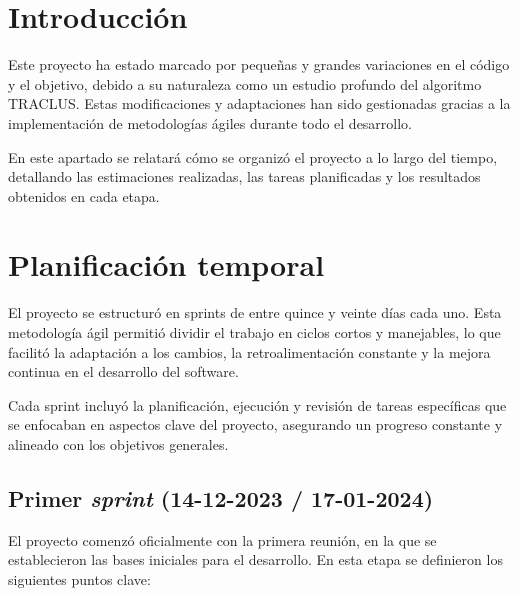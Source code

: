 
\section{Introducción}

Este proyecto ha estado marcado por pequeñas y grandes variaciones en el código y el objetivo, debido a su naturaleza como un estudio profundo del algoritmo TRACLUS. Estas modificaciones y adaptaciones han sido gestionadas gracias a la implementación de metodologías ágiles durante todo el desarrollo. 

En este apartado se relatará cómo se organizó el proyecto a lo largo del tiempo, detallando las estimaciones realizadas, las tareas planificadas y los resultados obtenidos en cada etapa.

\section{Planificación temporal}

El proyecto se estructuró en sprints de entre quince y veinte días cada uno. Esta metodología ágil permitió dividir el trabajo en ciclos cortos y manejables, lo que facilitó la adaptación a los cambios, la retroalimentación constante y la mejora continua en el desarrollo del software.

Cada sprint incluyó la planificación, ejecución y revisión de tareas específicas que se enfocaban en aspectos clave del proyecto, asegurando un progreso constante y alineado con los objetivos generales.

\subsection{Primer \textit{sprint} (14-12-2023 / 17-01-2024)}

El proyecto comenzó oficialmente con la primera reunión, en la que se establecieron las bases iniciales para el desarrollo. En esta etapa se definieron los siguientes puntos clave:

